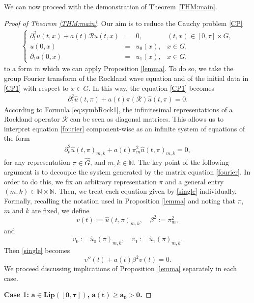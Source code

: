 \documentclass[12pt,oneside,a4paper]{book}
\numberwithin{equation}{section}     %
\theoremstyle{plain}
\theoremstyle{definition}
\newcommand{\N}{{\mathbb N}}
\begin{document}
We can now proceed with the demonstration of Theorem \ref{THM:main}.
\begin{proof}[Proof of Theorem \ref{THM:main}]
	Our aim is to reduce the Cauchy problem \eqref{CP} 
	\begin{align}\label{CP1}
	\left\{\begin{array}{rclc}
	\partial_t^2 u(t,x)+a(t)\mathcal R u(t,x)&=&0,&(t,x)\in[0,\tau]\times G,\\
	u(0,x)&=&u_0(x),&x\in G,\\
	\partial_t u(0,x)&=&u_1(x),&x\in G,
	\end{array}\right.
	\end{align}
	to a form in which we can apply Proposition \ref{lemma}. To do so, we take the group Fourier transform of the Rockland wave equation and of the initial data in \eqref{CP1} with respect to $x\in G$. In this way, the equation \eqref{CP1} becomes
	\begin{align}\label{fourier}
	\partial_t^2 \widehat u (t,\pi)+a(t)\pi(\mathcal R)\widehat u (t,\pi)=0.
	\end{align}
	According to Formula \eqref{eq:symbRock1}, the infinitesimal representations of a Rockland operator $\mathcal R$ can be seen as diagonal matrices. This allows us to interpret equation \eqref{fourier} component-wise as an infinite system of equations of the form
	\begin{align}\label{single}
	\partial_t^2 \widehat u (t,\pi)_{m,k}+a(t)\pi_m^2\widehat u (t,\pi)_{m,k}=0,
	\end{align}
	for any representation $\pi\in\widehat G$, and $m,k\in\N$. The key point of the following argument is to decouple the system generated by the matrix equation \eqref{fourier}. In order to do this, we fix an arbitrary representation $\pi$ and a general entry $(m,k)\in\N\times\N$. Then, we treat each equation given by \eqref{single} individually. Formally, recalling the notation used in Proposition \ref{lemma} and noting that $\pi$, $m$ and $k$ are fixed, we define
	\[
	v(t):=\widehat u(t,\pi)_{m,k},\quad \beta^2:=\pi_m^2,
	\]
	and
	\[
	v_0:=\widehat u_0 (\pi)_{m,k},\quad v_1:=\widehat u_1(\pi)_{m,k}.
	\]
	Then \eqref{single} becomes
	\[
	v''(t)+a(t)\beta^2 v(t)=0.
	\]
	We proceed discussing implications of Proposition \ref{lemma} separately in each case.
	
	\medskip
	\textbf{Case 1:} $\bm{a\in\mathbf{Lip}([0,\tau])}$\textbf{,} $\bm{a(t)\geq a_0>0}$\textbf{.}
	

\end{proof}
\end{document}
